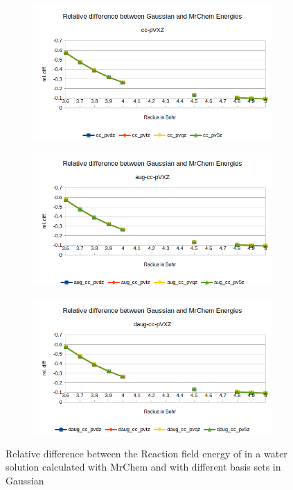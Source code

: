 \documentclass[../master_thesis.tex]{subfiles}
\begin{document}
\begin{figure}[h!]
  \centering
  \begin{subfigure}[b]{\linewidth}
    \includegraphics[width=\linewidth]{img/nopreldiff.png}
  \end{subfigure}
  \begin{subfigure}[b]{\linewidth}
    \includegraphics[width=\linewidth]{img/nopaugreldiff.png}
  \end{subfigure}
  \begin{subfigure}[b]{\linewidth}
    \includegraphics[width=\linewidth]{img/nopdaugreldiff.png}
  \end{subfigure}
  \caption{Relative difference between the Reaction field energy of  in a water solution calculated with MrChem
  and with different basis sets in Gaussian}
  \label{fig:nopreldiff}
\end{figure}
\end{document}
